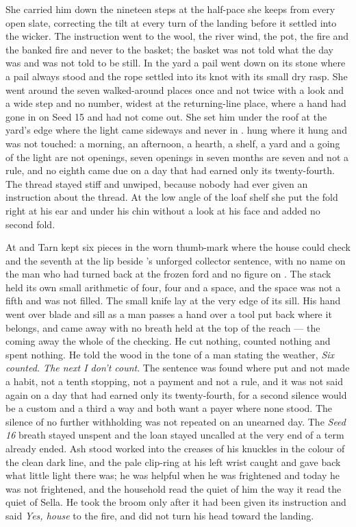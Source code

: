 She carried him down the nineteen steps at the half-pace she keeps from every open slate, correcting the tilt at every turn of the landing before it settled into the wicker. The instruction went to the wool, the river wind, the pot, the fire and the banked fire and never to the basket; the basket was not told what the day was and was not told to be still. In the yard a pail went down on its stone where a pail always stood and the rope settled into its knot with its small dry rasp. She went around the seven walked-around places once and not twice with a look and a wide step and no number, widest at the returning-line place, where a hand had gone in on Seed 15 and had not come out. She set him under the roof at the yard's edge where the light came sideways and never in .  hung where it hung and was not touched: a morning, an afternoon, a hearth, a shelf, a yard and a going of the light are not openings, seven openings in seven months are seven and not a rule, and no eighth came due on a day that had earned only its twenty-fourth. The thread stayed stiff and unwiped, because nobody had ever given an instruction about the thread. At the low angle of the loaf shelf she put the fold right at his ear and under his chin without a look at his face and added no second fold.

\scenebreak

At  and  Tarn kept six pieces in the worn thumb-mark where the house could check and the seventh at the lip beside 's unforged collector sentence, with no name on the man who had turned back at the frozen ford and no figure on . The stack held its own small arithmetic of four, four and a space, and the space was not a fifth and was not filled. The small knife lay at the very edge of its sill. His hand went over blade and sill as a man passes a hand over a tool put back where it belongs, and came away with no breath held at the top of the reach --- the coming away the whole of the checking. He cut nothing, counted nothing and spent nothing. He told the wood in the tone of a man stating the weather, \emph{Six counted. The next I don't count}. The sentence was found where put and not made a habit, not a tenth stopping, not a payment and not a rule, and it was not said again on a day that had earned only its twenty-fourth, for a second silence would be a custom and a third a way and both want a payer where none stood. The silence of no further withholding was not repeated on an unearned day. The \emph{Seed 16} breath stayed unspent and the loan stayed uncalled at the very end of a term already ended. Ash stood worked into the creases of his knuckles in the colour of the clean dark line, and the pale clip-ring at his left wrist caught and gave back what little light there was; he was helpful when he was frightened and today he was not frightened, and the household read the quiet of him the way it read the quiet of Sella. He took the broom only after it had been given its instruction and said \emph{Yes, house} to the fire, and did not turn his head toward the landing.

